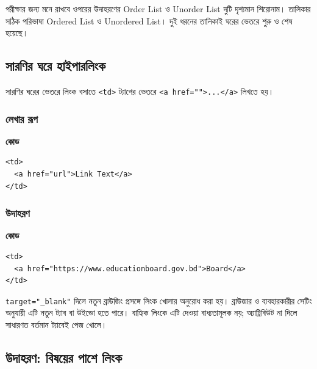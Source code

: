 \begin{boardbox}{পরীক্ষার জন্য মনে রাখবে}
ওপরের উদাহরণের Order List ও Unorder List দুটি দৃশ্যমান শিরোনাম। তালিকার সঠিক পরিভাষা Ordered List ও Unordered List। দুই ধরনের তালিকাই ঘরের ভেতরে শুরু ও শেষ হয়েছে।
\end{boardbox}

\subsection{সারণির ঘরে হাইপারলিংক}

সারণির ঘরের ভেতরে লিংক বসাতে \texttt{<td>} ট্যাগের ভেতরে \texttt{<a href="">...</a>} লিখতে হয়।

\par\noindent
\begin{minipage}[t]{.54\linewidth}\vspace{0pt}\small
\subsubsection{লেখার রূপ}

\textbf{\color{chFourTeal}কোড}\par
\begin{verbatim}
<td>
  <a href="url">Link Text</a>
</td>
\end{verbatim}
\par\smallskip
\end{minipage}\hfill
\begin{minipage}[t]{.42\linewidth}\vspace{0pt}\small
\subsubsection{উদাহরণ}

\textbf{\color{chFourTeal}কোড}\par
\begin{verbatim}
<td>
  <a href="https://www.educationboard.gov.bd">Board</a>
</td>
\end{verbatim}
\par\smallskip


\texttt{target="\_blank"} দিলে নতুন ব্রাউজিং প্রসঙ্গে লিংক খোলার অনুরোধ করা হয়। ব্রাউজার ও ব্যবহারকারীর সেটিং অনুযায়ী এটি নতুন ট্যাব বা উইন্ডো হতে পারে। বাহ্যিক লিংকে এটি দেওয়া বাধ্যতামূলক নয়; অ্যাট্রিবিউট না দিলে সাধারণত বর্তমান ট্যাবেই পেজ খোলে।
\end{minipage}\par
\subsection{উদাহরণ: বিষয়ের পাশে লিংক}

